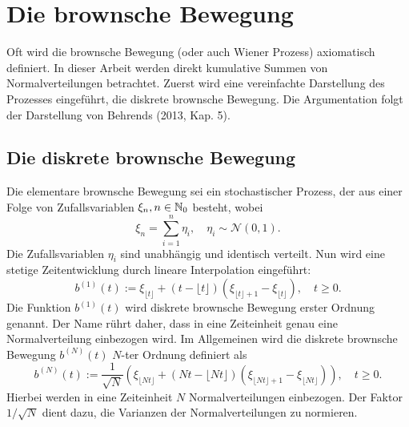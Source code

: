\section{Die brownsche Bewegung}

Oft wird die brownsche Bewegung (oder auch Wiener Prozess) axiomatisch definiert. In dieser Arbeit werden 
direkt kumulative Summen von Normalverteilungen betrachtet. Zuerst wird eine vereinfachte Darstellung des Prozesses eingeführt, 
die diskrete brownsche Bewegung. Die Argumentation folgt der Darstellung von Behrends \cite{behrends} (2013, Kap. 5).

\subsection{Die diskrete brownsche Bewegung}

\begin{defi}
Die elementare brownsche Bewegung sei ein stochastischer Prozess, 
der aus einer Folge von Zufallsvariablen $\xi_n, n \in \Bbb N_0$ besteht, wobei
$$\xi_n = \sum_{i=1}^n \eta_i, \quad \eta_i \sim \mathcal N(0,1).$$
Die Zufallsvariablen $\eta_i$ sind unabhängig und identisch verteilt.
Nun wird eine stetige Zeitentwicklung durch lineare Interpolation eingeführt:
$$b^{(1)}(t) := \xi_{\lfloor t \rfloor} + (t - \lfloor t \rfloor)(\xi_{\lfloor t \rfloor + 1} - \xi_{\lfloor t \rfloor}), \quad t \geq 0.$$
Die Funktion $b^{(1)}(t)$ wird diskrete brownsche Bewegung erster Ordnung genannt.
Der Name rührt daher, dass in eine Zeiteinheit genau eine Normalverteilung einbezogen wird.
Im Allgemeinen wird die diskrete brownsche Bewegung $b^{(N)}(t)$ $N$-ter Ordnung definiert als
$$b^{(N)}(t) := \frac{1}{\sqrt{N}} \left ( \xi_{\lfloor Nt \rfloor} + (Nt - \lfloor Nt \rfloor)(\xi_{\lfloor Nt \rfloor + 1} - \xi_{\lfloor Nt \rfloor}) \right ), \quad t \geq 0.$$
Hierbei werden in eine Zeiteinheit $N$ Normalverteilungen einbezogen. Der Faktor $1/\sqrt{N}$ dient dazu, die Varianzen der Normalverteilungen zu normieren.

\end{defi}

